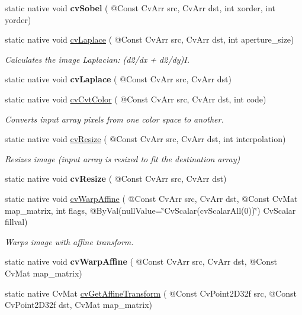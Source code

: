 \begin{DoxyCompactItemize}
static native void {\bfseries cv\+Sobel} ( @Const Cv\+Arr src, Cv\+Arr dst, int xorder, int yorder)
\item 
static native void \hyperlink{group__imgproc__c_ga4b503d9c276d19dbced13ecd77b845a2}{cv\+Laplace} ( @Const Cv\+Arr src, Cv\+Arr dst, int aperture\+\_\+size)
\begin{DoxyCompactList}\small\item\em Calculates the image Laplacian\+: (d2/dx + d2/dy)I. \end{DoxyCompactList}\item 
static native void {\bfseries cv\+Laplace} ( @Const Cv\+Arr src, Cv\+Arr dst)
\item 
static native void \hyperlink{group__imgproc__c_gae45ba0b6ff1ccbe51ca42d2c6d6373bb}{cv\+Cvt\+Color} ( @Const Cv\+Arr src, Cv\+Arr dst, int code)
\begin{DoxyCompactList}\small\item\em Converts input array pixels from one color space to another. \end{DoxyCompactList}\item 
static native void \hyperlink{group__imgproc__c_ga45f9e0fb1d7c7f64227f5351c8e4bb2b}{cv\+Resize} ( @Const Cv\+Arr src, Cv\+Arr dst, int interpolation)
\begin{DoxyCompactList}\small\item\em Resizes image (input array is resized to fit the destination array) \end{DoxyCompactList}\item 
static native void {\bfseries cv\+Resize} ( @Const Cv\+Arr src, Cv\+Arr dst)
\item 
static native void \hyperlink{group__imgproc__c_gabf1cb9d4218222026652e60bea3c8b17}{cv\+Warp\+Affine} ( @Const Cv\+Arr src, Cv\+Arr dst, @Const Cv\+Mat map\+\_\+matrix, int flags, @By\+Val(null\+Value=\char`\"{}Cv\+Scalar(cv\+Scalar\+All(0))\char`\"{}) Cv\+Scalar fillval)
\begin{DoxyCompactList}\small\item\em Warps image with affine transform. \end{DoxyCompactList}\item 
static native void {\bfseries cv\+Warp\+Affine} ( @Const Cv\+Arr src, Cv\+Arr dst, @Const Cv\+Mat map\+\_\+matrix)
\item 
static native Cv\+Mat \hyperlink{group__imgproc__c_ga6deb33dc741b5402e8660d553cf299c3}{cv\+Get\+Affine\+Transform} ( @Const Cv\+Point2\+D32f src, @Const Cv\+Point2\+D32f dst, Cv\+Mat map\+\_\+matrix)

\end{DoxyCompactItemize}
